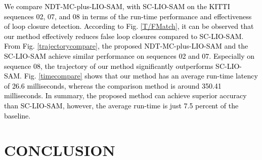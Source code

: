 \documentclass[letterpaper, 10 pt, conference]{ieeeconf}   %
\newcommand\kevin[1]{\textcolor{black}{#1}}
\begin{document}
\kevin{We compare NDT-MC-plus-LIO-SAM, with SC-LIO-SAM on the KITTI sequences 02, 07, and 08 in terms of the run-time performance and effectiveness of loop closure detection. According to Fig. \ref{T/FMatch}, it can be observed that our method effectively reduces false loop closures compared to SC-LIO-SAM. From Fig. \ref{trajectorycompare}, the proposed NDT-MC-plus-LIO-SAM and the SC-LIO-SAM achieve similar performance on sequences 02 and 07. Especially on sequence 08, the trajectory of our method significantly outperforms SC-LIO-SAM. Fig. \ref{timecompare} shows that our method has an average run-time  latency of 26.6 milliseconds, whereas the comparison method is around 350.41 milliseconds. In summary, the proposed method can achieve superior accuracy than SC-LIO-SAM, however, the average run-time is just 7.5 percent of the baseline.}

\section{CONCLUSION}
\end{document}
